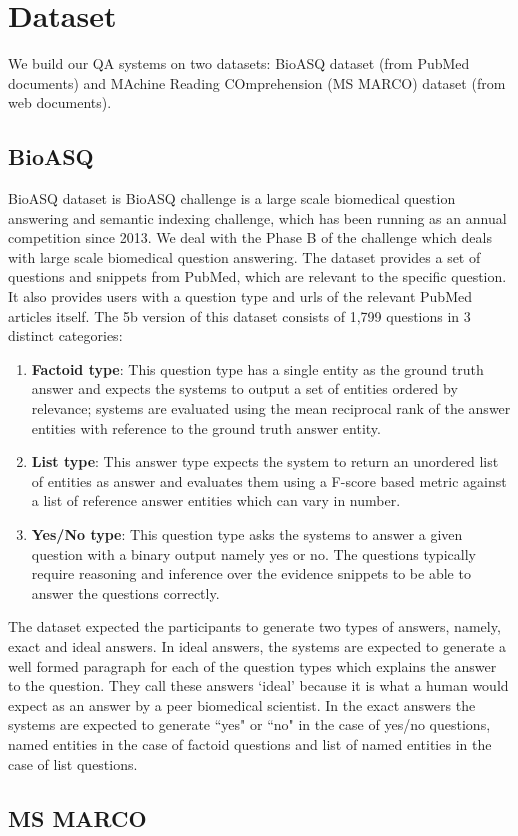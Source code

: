 
\section{Dataset}

We build our QA systems on two datasets: BioASQ dataset (from PubMed documents) and MAchine Reading COmprehension (MS MARCO) dataset (from web documents).

\subsection{BioASQ}
\label{Dataset}

BioASQ dataset is 
BioASQ challenge \cite{bioasq} is a large scale biomedical question answering and semantic indexing challenge, which has been running as an annual competition since 2013. %
We deal with the Phase B of the challenge which deals with large scale biomedical question answering. The dataset provides a set of questions and snippets from PubMed, which are relevant to the specific question. It also provides users with a question type and urls of the relevant PubMed articles itself. The 5b version of this dataset consists of 1,799 questions in 3 distinct categories:
\begin{enumerate}
    \item \textbf{Factoid type}: This question type has a single entity as the ground truth answer and expects the systems to output a set of  entities ordered by relevance; systems are evaluated using the mean reciprocal rank \cite{MRR} of the answer entities with reference to the ground truth answer entity.
    \item \textbf{List type}: This answer type expects the system to return an unordered list of entities as answer and evaluates them using a F-score based metric against a list of reference answer entities which can vary in number.
    \item \textbf{Yes/No type}: This question type asks the systems to answer a given question with a binary output namely yes or no. The questions typically require reasoning and inference over the evidence snippets to be able to answer the questions correctly.
\end{enumerate}

The dataset expected the participants to generate two types of answers, namely, exact and ideal answers. 
In ideal answers, the systems are expected to generate a well formed paragraph for each of the question types which explains the answer to the question. They call these answers `ideal' because it is what a human would expect as an answer by a peer biomedical scientist. In the exact answers the systems are expected to generate ``yes" or ``no" in the case of yes/no questions, named entities in the case of factoid questions and list of named entities in the case of list questions.

\subsection{MS MARCO}